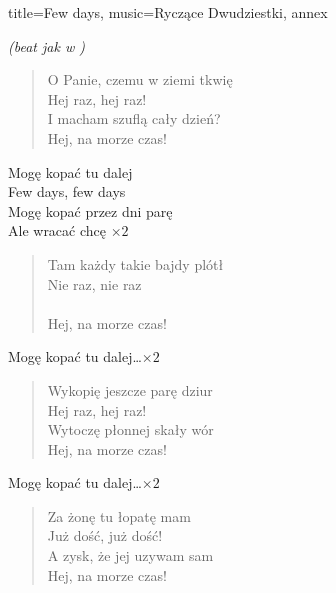 \newpage
\begin{song}{title={Few days}, music={Ryczące Dwudziestki}, annex}
    \begin{info}
        \textit{(beat jak w )}
    \end{info}
    \begin{multicols}{2}
    \begin{verse}
        O Panie, czemu w ziemi tkwię \\
        Hej raz, hej raz! \\
        I macham szuflą cały dzień? \\
        Hej, na morze czas!
    \end{verse}
    \begin{chorus}
        Mogę kopać tu dalej \\
        Few days, few days \\
        Mogę kopać przez dni parę \\
        Ale wracać chcę $\times 2$
    \end{chorus}
    \begin{verse}
        Tam każdy takie bajdy plótł \\
        Nie raz, nie raz \\
         \\
        Hej, na morze czas!
    \end{verse}
    \begin{chorus}
        Mogę kopać tu dalej\ldots $\times 2$ 
    \end{chorus}
    \vfill\null\columnbreak{}
    \begin{verse}
        Wykopię jeszcze parę dziur \\
        Hej raz, hej raz! \\
        Wytoczę płonnej skały wór \\
        Hej, na morze czas!
    \end{verse}
    \begin{chorus}
        Mogę kopać tu dalej\ldots $\times 2$ 
    \end{chorus}
    \begin{verse}
        Za żonę tu łopatę mam \\
        Już dość, już dość! \\
        A zysk, że jej uzywam sam \\
        Hej, na morze czas!
    \end{verse}
    \begin{chorus}

\end{chorus}
\end{multicols}
\end{song}

